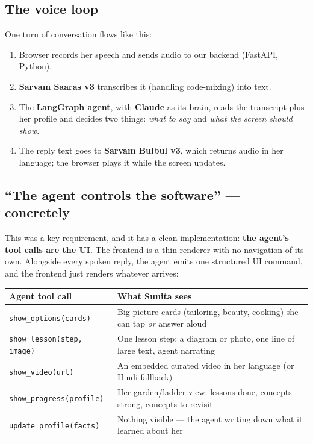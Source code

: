 \documentclass[11pt]{article}
\begin{document}
\subsection{The voice loop}

One turn of conversation flows like this:

\begin{enumerate}
  \item Browser records her speech and sends audio to our backend (FastAPI, Python).
  \item \textbf{Sarvam Saaras v3} transcribes it (handling code-mixing) into text.
  \item The \textbf{LangGraph agent}, with \textbf{Claude} as its brain, reads the transcript plus her profile and decides two things: \emph{what to say} and \emph{what the screen should show}.
  \item The reply text goes to \textbf{Sarvam Bulbul v3}, which returns audio in her language; the browser plays it while the screen updates.
\end{enumerate}

\subsection{``The agent controls the software'' --- concretely}

This was a key requirement, and it has a clean implementation: \textbf{the agent's tool calls are the UI}. The frontend is a thin renderer with no navigation of its own. Alongside every spoken reply, the agent emits one structured UI command, and the frontend just renders whatever arrives:

\begin{center}
\begin{tabular}{p{5.2cm} p{8.6cm}}
\toprule
\textbf{Agent tool call} & \textbf{What Sunita sees} \\
\midrule
\texttt{show\_options(cards)} & Big picture-cards (tailoring, beauty, cooking) she can tap \emph{or} answer aloud \\
\texttt{show\_lesson(step, image)} & One lesson step: a diagram or photo, one line of large text, agent narrating \\
\texttt{show\_video(url)} & An embedded curated video in her language (or Hindi fallback) \\
\texttt{show\_progress(profile)} & Her garden/ladder view: lessons done, concepts strong, concepts to revisit \\
\texttt{update\_profile(facts)} & Nothing visible --- the agent writing down what it learned about her \\
\bottomrule
\end{tabular}
\end{center}
\end{document}
